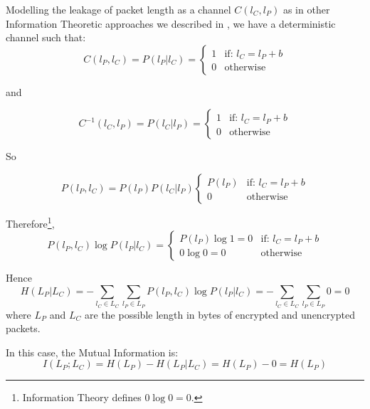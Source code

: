 Modelling the leakage of packet length as a channel $C(l_{C},l_{P})$ as in other Information Theoretic approaches we described in , we have a deterministic channel such that:
\begin{equation}
	C(l_{P}, l_{C}) = P(l_{P} | l_{C}) = 
	\begin{cases}
		1 &\text{if: } l_{C} = l_{P} + b \\
		0 &\text{otherwise}
	\end{cases}
\end{equation}

and

\begin{equation}
	C^{-1}(l_{C}, l_{P}) = P(l_{C} | l_{P}) = 
	\begin{cases}
		1 &\text{if: } l_{C} = l_{P} + b \\
		0 &\text{otherwise}
	\end{cases}
\end{equation}

So

\begin{equation}
	P(l_{P} , l_{C}) = P(l_{P}) P(l_{C} | l_{P})
	\begin{cases}
		P(l_{P}) &\text{if: } l_{C} = l_{P} + b \\
		0 &\text{otherwise}
	\end{cases}
\end{equation}

Therefore\footnote{Information Theory defines $0\log{0} = 0$.},
\begin{equation}
	P(l_{P} , l_{C}) \log{P(l_{P} | l_{C})} = 
	\begin{cases}
		P(l_{P})\log{1} = 0 &\text{if: } l_{C} = l_{P} + b \\
		0 \log{0} = 0 &\text{otherwise}
	\end{cases}
\end{equation}

Hence
\begin{equation}
	H(L_{P} | L_{C}) = - \sum_{l_{C} \in L_{C}} \sum_{l_{P} \in L_{P}}P(l_{P} , l_{C}) \log{P(l_{P} | l_{C})} = - \sum_{l_{C} \in L_{C}} \sum_{l_{P} \in L_{P}} 0 = 0
\end{equation}
where $L_{P}$ and $L_{C}$ are the possible length in bytes of encrypted and unencrypted packets.

In this case, the Mutual Information is:
\begin{equation} \label{Eq: MI in length}
	I(L_{P};L_{C}) = H(L_{P}) - H(L_{P} | L_{C} ) = H(L_{P}) - 0 = H(L_{P})
\end{equation}

